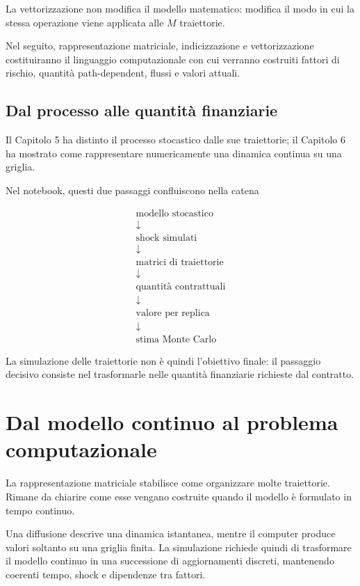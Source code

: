La vettorizzazione non modifica il modello matematico: modifica il modo in cui
la stessa operazione viene applicata alle \(M\) traiettorie.

Nel seguito, rappresentazione matriciale, indicizzazione e vettorizzazione
costituiranno il linguaggio computazionale con cui verranno costruiti fattori
di rischio, quantit\`a path-dependent, flussi e valori attuali.

\subsection{Dal processo alle quantit\`a finanziarie}

Il Capitolo 5 ha distinto il processo stocastico dalle sue traiettorie; il
Capitolo 6 ha mostrato come rappresentare numericamente una dinamica continua
su una griglia.

Nel notebook, questi due passaggi confluiscono nella catena

\[
\begin{array}{c}
\text{modello stocastico}
\\[3pt]
\downarrow
\\[3pt]
\text{shock simulati}
\\[3pt]
\downarrow
\\[3pt]
\text{matrici di traiettorie}
\\[3pt]
\downarrow
\\[3pt]
\text{quantit\`a contrattuali}
\\[3pt]
\downarrow
\\[3pt]
\text{valore per replica}
\\[3pt]
\downarrow
\\[3pt]
\text{stima Monte Carlo}
\end{array}
\]

La simulazione delle traiettorie non \`e quindi l'obiettivo finale: il
passaggio decisivo consiste nel trasformarle nelle quantit\`a finanziarie
richieste dal contratto.


\section{Dal modello continuo al problema computazionale}

La rappresentazione matriciale stabilisce come organizzare molte traiettorie.
Rimane da chiarire come esse vengano costruite quando il modello \`e formulato
in tempo continuo.

Una diffusione descrive una dinamica istantanea, mentre il computer produce
valori soltanto su una griglia finita. La simulazione richiede quindi di
trasformare il modello continuo in una successione di aggiornamenti discreti,
mantenendo coerenti tempo, shock e dipendenze tra fattori.

